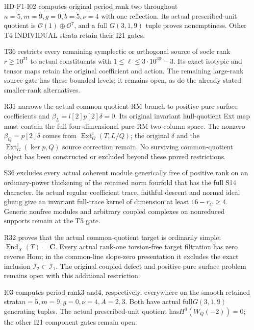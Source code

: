 HD-F1-I02 computes original period rank two throughout $n=5,m=9,g=0,b=5,\nu=4$ with one reflection. Its actual prescribed-unit quotient is $\mathcal O(1)\oplus\mathcal O^7$, and a full $G(3,1,9)$ tuple proves nonemptiness. Other T4-INDIVIDUAL strata retain their I21 gates.




T36 restricts every remaining symplectic or orthogonal source of socle rank $r\ge10^{31}$ to actual constituents with $1\le\ell\le3\cdot10^{30}-3$. Its exact isotypic and tensor maps retain the original coefficient and action. The remaining large-rank source gate has these bounded levels; it remains open, as do the already stated smaller-rank alternatives.




R31 narrows the actual common-quotient RM branch to positive pure surface coefficients and $\beta_L=l[2]p[2]\delta=0$. Its original invariant hull-quotient Ext map must contain the full four-dimensional pure RM two-column space. The nonzero $\beta_Q=p[2]\delta$ comes from $\operatorname{Ext}^1_G(T,L/Q)$; the original $\delta$ and the $\operatorname{Ext}^1_G(\ker p,Q)$ source correction remain. No surviving common-quotient object has been constructed or excluded beyond these proved restrictions.



S36 excludes every actual coherent module generically free of positive rank on an ordinary-power thickening of the retained norm fourfold that has the full S14 character. Its actual regular coefficient trace, faithful descent and normal ideal gluing give an invariant full-trace kernel of dimension at least $16-r_C\ge4$. Generic nonfree modules and arbitrary coupled complexes on nonreduced supports remain at the T5 gate.


R32 proves that the actual common-quotient target is ordinarily simple: $\operatorname{End}_X(T)=\mathbf C$. Every actual rank-one torsion-free target filtration has zero reverse Hom; in the common-line slope-zero presentation it excludes the exact inclusion $\mathcal I_2\subset\mathcal I_1$. The original coupled defect and positive-pure surface problem remains open with this additional restriction.


I03 computes period rank$3$ and$4$, respectively, everywhere on the smooth retained strata$n=5,m=9,g=0,\nu=4,A=2,3$. Both have actual full$G(3,1,9)$ generating tuples. The actual prescribed-unit quotient has$H^0(W_Q(-2))=0$; the other I21 component gates remain open.


